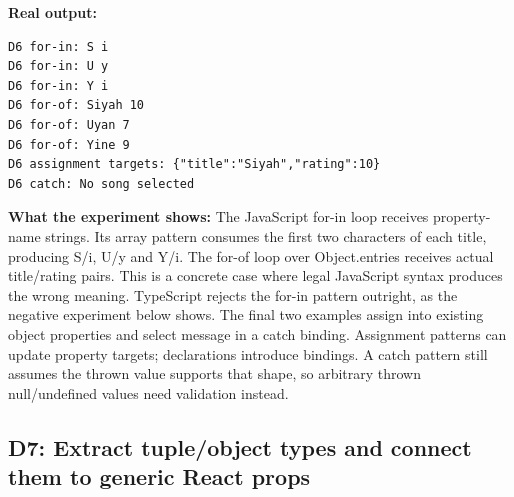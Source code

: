 \documentclass[
  10pt,
  a4paper,
  titlepage]{article}
\begin{document}

\textbf{Real output:}

\Needspace{82.4pt}
\begin{lstlisting}
D6 for-in: S i
D6 for-in: U y
D6 for-in: Y i
D6 for-of: Siyah 10
D6 for-of: Uyan 7
D6 for-of: Yine 9
D6 assignment targets: {"title":"Siyah","rating":10}
D6 catch: No song selected
\end{lstlisting}

\textbf{What the experiment shows:} The JavaScript for-in loop receives
property-name strings. Its array pattern consumes the first two
characters of each title, producing S/i, U/y and Y/i. The for-of loop
over Object.entries receives actual title/rating pairs. This is a
concrete case where legal JavaScript syntax produces the wrong meaning.
TypeScript rejects the for-in pattern outright, as the negative
experiment below shows. The final two examples assign into existing
object properties and select message in a catch binding. Assignment
patterns can update property targets; declarations introduce bindings. A
catch pattern still assumes the thrown value supports that shape, so
arbitrary thrown null/undefined values need validation instead.

\subsection{D7: Extract tuple/object types and connect them to generic
React
props}\label{d7-extract-tupleobject-types-and-connect-them-to-generic-react-props}
\end{document}
